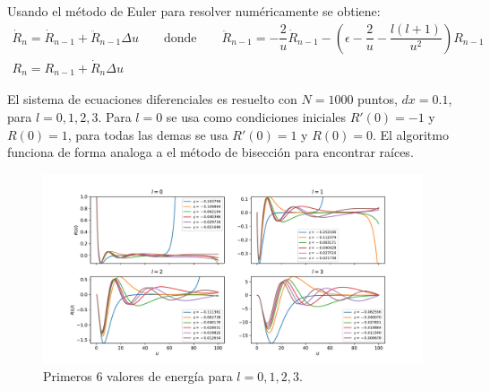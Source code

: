 \documentclass[paper=letter, fontsize=11pt]{scrartcl}
\begin{document}
Usando el m\'etodo de Euler para resolver num\'ericamente se obtiene:
\begin{equation}
	\begin{matrix}
	\dot{R}_n = \dot{R}_{n-1} + \ddot{R}_{n-1}\Delta u \qquad \text{donde} \qquad \ddot{R}_{n-1} = -\dfrac{2}{u}\dot{R}_{n-1} - \left(\epsilon - \dfrac{2}{u} - \dfrac{l(l+1)}{u^2}\right)R_{n-1} \\
	R_n = R_{n-1} + \dot{R}_n\Delta u
	\end{matrix}
\end{equation}

El sistema de ecuaciones diferenciales es resuelto con $N = 1000$ puntos, $dx = 0.1$, para $l = 0, 1, 2, 3$. Para $l = 0$ se usa como condiciones iniciales $R'(0) = -1$ y $R(0) = 1$, para todas las demas se usa $R'(0) = 1$ y $R(0) = 0$. El algoritmo funciona de forma analoga a el m\'etodo de bisecci\'on para encontrar ra\'ices.


\newpage
\begin{figure}[ht]
	\centering
	\includegraphics[width=\linewidth]{R.pdf}
	\caption{Primeros 6 valores de energ\'ia para $l = 0, 1, 2, 3$.}
	\label{fig:functions}
\end{figure}
\end{document}
